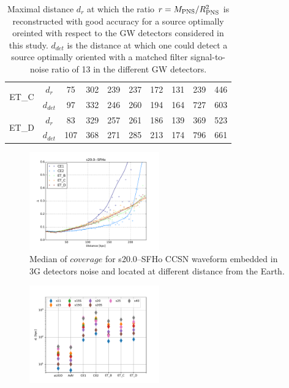 \begin{table}
\begin{tabular}{c|c|cccccccc}
\hline
\multirow{2}{*}{ET\_C} & $d_{r}$ & 75  & 302 & 239 & 237 & 172 & 131 & 239 & 446 \\
\cline{2-10}
                       & $d_{det}$ & 97 & 332 & 246 & 260 & 194 & 164 & 727  & 603\\

\hline
\multirow{2}{*}{ET\_D} & $d_{r}$ & 83  & 329 & 257 & 261 & 186 & 139 & 369 & 523 \\
\cline{2-10}
                       & $d_{det}$ & 107 & 368 & 271 & 285 & 213 & 174 & 796  & 661\\

  \end{tabular}
  \caption{%
    Maximal distance $d_{r}$ at which the ratio $r=M_{\rm PNS}/R_{\rm PNS}^2$ is reconstructed
    with good accuracy for a source optimally oreinted with respect to the GW detectors
    considered in this study. $d_{det}$ is the distance at which one could detect a source
    optimally oriented with a matched filter signal-to-noise ratio of 13 in the  different
    GW detectors.
  }
  \label{tab:results}
\end{table}

\begin{figure}
  \centering
  \includegraphics[width=0.5\textwidth]{plots/s20--SFHo_all3G}
  \caption{Median of $coverage$ for s20.0--SFHo CCSN waveform embedded in 3G detectors noise and located at different distance from the Earth. } \label{fig:s20--SFHo_all3G}
\end{figure}

\begin{figure}
  \centering
  \includegraphics[width=0.5\textwidth]{plots/dist_allwvfs_2G3G}
  \caption{} \label{fig:distances}
\end{figure}
